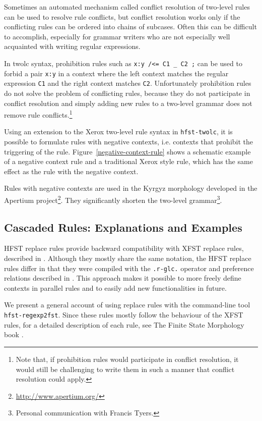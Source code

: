 \documentclass[draft]{llncs}
\begin{document}
Sometimes an automated mechanism called conflict resolution of
two-level rules~\cite{silfverberg/2009/2} can be used to resolve rule
conflicts, but conflict resolution works only if the conflicting rules
can be ordered into chains of subcases. Often this can be difficult
to accomplish, especially for grammar writers who are not especially
well acquainted with writing regular expressions.

In twolc syntax, prohibition rules such as {\tt x:y /<= C1 \_ C2 ;}
can be used to forbid a pair {\tt x:y} in a context where the left
context matches the regular expression {\tt C1} and the right context
matches {\tt C2}. Unfortunately prohibition rules do not solve the
problem of conflicting rules, because they do not participate in conflict
resolution and simply adding new rules to a two-level grammar does not
remove rule conflicts.\footnote{Note that, if prohibition rules would
  participate in conflict resolution, it would still be challenging to
  write them in such a manner that conflict resolution could apply.}

Using an extension to the Xerox two-level rule syntax in
\verb|hfst-twolc|, it is possible to formulate rules with negative
contexts, i.e. contexts that prohibit the triggering of the
rule. Figure~\ref{negative-context-rule} shows a schematic example of
a negative context rule and a traditional Xerox style rule, which has
the same effect as the rule with the negative context.

Rules with negative contexts are used in the Kyrgyz morphology
developed in the Apertium project\footnote{\url{http://www.apertium.org/}}.
They significantly shorten the two-level
grammar\footnote{Personal communication with Francis Tyers.}.


\subsection{Cascaded Rules: Explanations and Examples}

HFST replace rules provide backward compatibility with XFST replace rules, 
described in \cite{Kempe96parallelreplacement,beesley/2003}. 
Although they mostly share the same notation, the HFST replace rules differ in that
they were compiled with the \verb!.r-glc.! operator \cite{Gerdemann/1999} and preference
relations described in \cite{ylijyra/2008b}. This approach makes it possible to more freely
define contexts in parallel rules and to easily add new functionalities in future.

We present a general account of using replace rules with the command-line tool {\tt hfst-regexp2fst}. Since these rules mostly follow the behaviour of the XFST rules,
for a detailed description of each rule, see The Finite State Morphology book \cite{beesley/2003}.
\end{document}
